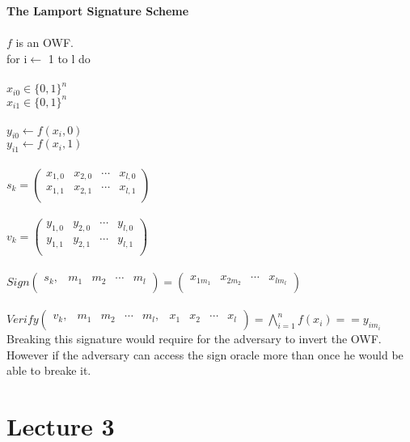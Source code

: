 \documentclass[oneside,a4paper,12pt]{book}
\begin{document}
\textbf{The Lamport Signature Scheme}\\\\
$f$ is an OWF.\\
for i$\gets$ 1 to l do\\\\
$x_{i0} \in \{0,1\}^n$\\
$x_{i1} \in \{0,1\}^n$\\\\
$y_{i0} \gets f(x_i,0)$\\
$y_{i1} \gets f(x_i,1)$\\\\
$s_k = \begin{pmatrix}
  x_{1,0} & x_{2,0} & \cdots & x_{l,0} \\
  x_{1,1} & x_{2,1} & \cdots & x_{l,1} \\
\end{pmatrix}$\\\\
$v_k = \begin{pmatrix}
  y_{1,0} & y_{2,0} & \cdots & y_{l,0} \\
  y_{1,1} & y_{2,1} & \cdots & y_{l,1} \\
\end{pmatrix}$\\\\
$Sign\begin{pmatrix}
  s_k, & m_1 & m_2 & \cdots & m_l \\
\end{pmatrix}=\begin{pmatrix}
  x_{1 m_1} & x_{2 m_2} & \cdots & x_{l m_l} \\
\end{pmatrix}$\\\\
$Verify\begin{pmatrix}
  v_k, & m_1 & m_2 & \cdots & m_l, & x_1 &x_2 & \cdots & x_l\\
\end{pmatrix}=\bigwedge^{n}_{i=1}f(x_i) == y_{i m_i}$\\

Breaking this signature would require for the adversary to invert the OWF.\\

However if the adversary can access the sign oracle more than once he would be able to breake it.

\chapter{Lecture 3}%
\end{document}
